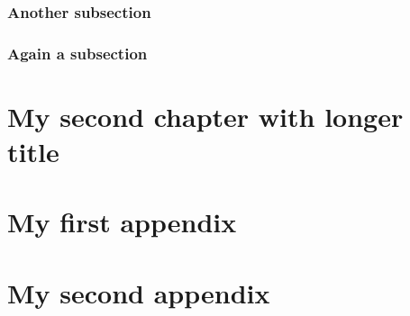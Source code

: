 \documentclass[%
	papersize=a4,%
	pagelayout=default,%
	fontname=latinmodern,%
	fontsize=11pt,%
	twoside,%
	final,%
	faculty=fpms%
]{umons-Thesis}%
\begin{document}
			
			\subsection{Another subsection}
			
				\lipsum[7-9]
			
			\subsection{Again a subsection}
			
				\blindtext
	
	
	\chapter{My second chapter with longer title}
	
		\Blindtext[16]
		
	
	\appendix
	\appendixpage
	
	
	\chapter{My first appendix}
	
		\Blindtext[8]
	
	\chapter{My second appendix}
	
		\Blindtext[8]


\backmatter
\end{document}
